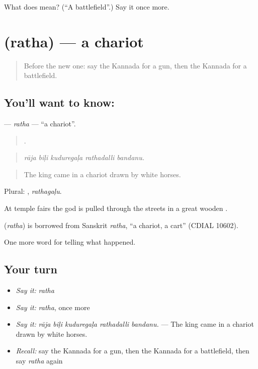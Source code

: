 \begin{tcolorbox}[breakable,colback=teal!4,colframe=teal!35!black,title={Before you move on}]
What does  mean? (\textquotedblleft{}A battlefield\textquotedblright{}.) Say it once more.
\end{tcolorbox}
\section[\texorpdfstring{\kn{ರಥ} (ratha)}{ರಥ (ratha)}]{ (ratha) — a chariot}

\label{lesson:KA-C344-ratha}



\begin{quote}
Before the new one: say the Kannada for a gun, then the Kannada for a battlefield.
\end{quote}

\subsection*{You'll want to know: }
\textbf{} — \emph{ratha} — \textquotedblleft{}a chariot\textquotedblright{}.

\begin{quote}
    .
\end{quote}

\begin{quote}
\emph{rāja biḷi kuduregaḷa rathadalli bandanu.}
\end{quote}

\begin{quote}
The king came in a chariot drawn by white horses.
\end{quote}

Plural: , \emph{rathagaḷu}.

At temple fairs the god is pulled through the streets in a great wooden .

\begin{cousinweb}
\textbf{} (\emph{ratha}) is borrowed from Sanskrit \emph{ratha}, \textquotedblleft{}a chariot, a cart\textquotedblright{} (CDIAL 10602).
\end{cousinweb}

\begin{grammarlens}[title={What you've built}]
One more word for telling what happened.
\end{grammarlens}

\subsection*{Your turn}
\begin{itemize}
\raggedright
  \item \emph{Say it:} \emph{ratha}
  \item \emph{Say it:} \emph{ratha}, once more
  \item \emph{Say it:} \emph{rāja biḷi kuduregaḷa rathadalli bandanu.} — The king came in a chariot drawn by white horses.
  \item \emph{Recall:} say the Kannada for a gun, then the Kannada for a battlefield, then say \emph{ratha} again
\end{itemize}

